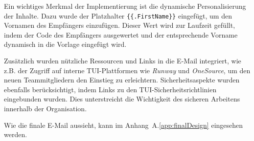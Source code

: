 Ein wichtiges Merkmal der Implementierung ist die dynamische Personalisierung der Inhalte. Dazu wurde der Platzhalter \texttt{\{\{.FirstName\}\}} eingefügt, um den Vornamen des Empfängers einzufügen. Dieser Wert wird zur Laufzeit gefüllt, indem der Code des Empfängers ausgewertet und der entsprechende Vorname dynamisch in die Vorlage eingefügt wird.

Zusätzlich wurden nützliche Ressourcen und Links in die E-Mail integriert, wie z.B. der Zugriff auf interne TUI-Plattformen wie \textit{Runway} und \textit{OneSource}, um den neuen Teammitgliedern den Einstieg zu erleichtern. Sicherheitsaspekte wurden ebenfalls berücksichtigt, indem Links zu den TUI-Sicherheitsrichtlinien eingebunden wurden. Dies unterstreicht die Wichtigkeit des sicheren Arbeitens innerhalb der Organisation.

Wie die finale E-Mail aussieht, kann im Anhang~A.\ref{app:finalDesign} eingesehen werden.



